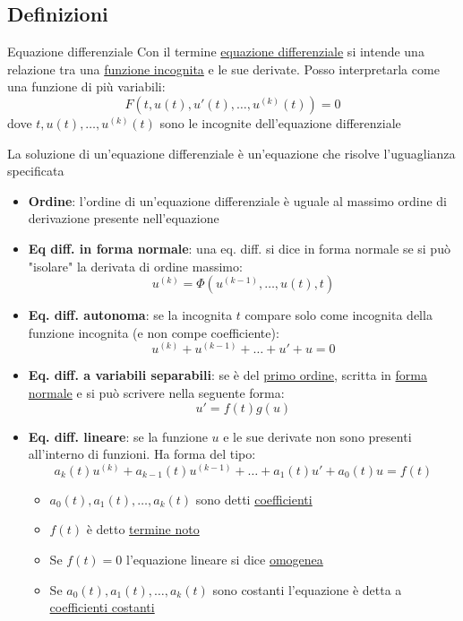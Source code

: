 \subsection{Definizioni}
\begin{definizione}{Equazione differenziale}
	Con il termine \underline{equazione differenziale} si intende una relazione tra una \underline{funzione incognita} e le sue derivate. Posso interpretarla come una funzione di più variabili:
	\[
		F\left( t, u\left( t \right) , u'\left( t \right) ,\ldots, u^{\left( k \right) }\left( t \right)  \right)=0
	\]
	dove $ t, u\left( t \right) ,\ldots, u^{\left( k \right) }\left( t \right)  $ sono le incognite dell'equazione differenziale

\end{definizione}
La soluzione di un'equazione differenziale è un'equazione che risolve l'uguaglianza specificata
\begin{itemize}
	\item \textbf{Ordine}: l'ordine di un'equazione differenziale è uguale al massimo ordine di derivazione presente nell'equazione
	\item \textbf{Eq diff. in forma normale}: una eq. diff. si dice in forma normale se si può "isolare" la derivata di ordine massimo:
	      \[
		      u^{\left( k \right) } = \Phi \left( u^{\left( k-1 \right) },\ldots, u\left( t \right) ,t \right)
	      \]
	\item \textbf{Eq. diff. autonoma}: se la incognita $ t $ compare solo come incognita della funzione incognita (e non compe coefficiente):
	      \[
		      u^{\left( k \right) }+ u ^{\left( k-1 \right) }+\ldots+u' + u =0
	      \]
	\item \textbf{Eq. diff. a variabili separabili}: se è del \underline{primo ordine}, scritta in \underline{forma normale} e si può scrivere nella seguente forma:
	      \[
		      u'= f\left( t \right) g\left( u \right)
	      \]
	\item \textbf{Eq. diff. lineare}: se la funzione $ u $ e le sue derivate non sono presenti all'interno di funzioni. Ha forma del tipo:
	      \[
		      a_k\left( t \right) u^{\left( k \right) }+ a_{k-1}\left( t \right) u^{\left( k-1 \right) }+\ldots+ a_1\left( t \right) u'+ a_0\left( t \right) u = f\left( t \right)
	      \]
	      \begin{itemize}
		      \item $ a_0\left( t \right) , a_1\left( t \right) ,\ldots, a_k\left( t \right)  $ sono detti \underline{coefficienti}
		      \item $ f\left( t \right)  $ è detto \underline{termine noto}
		      \item Se $ f\left( t \right) =0 $ l'equazione lineare si dice \underline{omogenea}
		      \item Se $ a_0\left( t \right) , a_1\left( t \right) ,\ldots, a_k\left( t \right)  $ sono costanti l'equazione è detta a \underline{coefficienti costanti}
	      \end{itemize}
\end{itemize}

